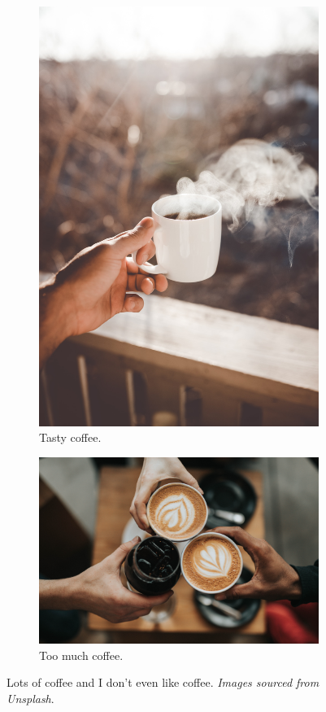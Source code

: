 \documentclass[a4paper, 12pt]{article}
\begin{document}
\begin{figure}
\begin{subfigure}[b]{0.3\linewidth}
    \includegraphics[width=\linewidth]{Figures/clay-banks-_wkd7XBRfU4-unsplash.jpg}
    \caption{Tasty coffee.}
  \end{subfigure}
  \begin{subfigure}[b]{0.8\linewidth}
    \includegraphics[width=\linewidth]{Figures/nathan-dumlao-6VhPY27jdps-unsplash.jpg}
    \caption{Too much coffee.}
  \end{subfigure}
  \caption{Lots of coffee and I don't even like coffee. \textsl{Images sourced from Unsplash}.}
  \label{fig:coffee3}
\end{figure}
\newpage
\end{document}
